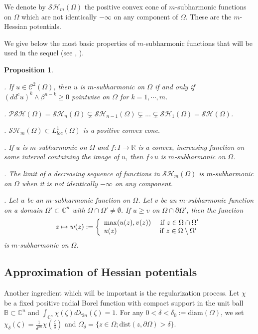 \documentclass[12pt]{amsart}
\newtheorem{proposition}[theorem]{Proposition}
\theoremstyle{definition}
\numberwithin{theorem}{section}
\numberwithin{equation}{section}
\newcommand{\B}{\mathbb{B}}
\newcommand{\C}{\mathbb{C}}
\begin{document}
We denote by $\mathcal{SH}_m (\Omega) $ the positive convex cone of $m$-subharmonic functions on $\Omega$ which are not identically $-\infty$ on any component of $\Omega$.  These are the $m$-Hessian potentials.

We give below the most basic properties of $m$-subharmonic functions that will be used in the sequel (see \cite{Bl05}, \cite{Lu12}).

\begin{proposition}\label{prop:basic}

.  If $u\in \mathcal{C}^2(\Omega)$, then $u$ is  $m$-subharmonic on $\Omega$ if and only if $(dd^c u)^k\wedge \beta^{n-k}\geq0$
pointwise on $\Omega$ for $k=1, \cdots, m$.

 . $\mathcal{PSH}(\Omega)=\mathcal{SH}_n(\Omega)\subsetneq \mathcal{SH}_{n-1}(\Omega)\subsetneq...\subsetneq \mathcal{SH}_1(\Omega)=\mathcal{SH}(\Omega) $.
 
.  $\mathcal{SH}_m(\Omega) \subset L^1_{loc} (\Omega)$ is a positive convex cone. 
  
.  If $u$ is $m$-subharmonic on $\Omega$ and $f: I \rightarrow\mathbb{R}$ is a  convex, increasing function on some interval containing the image of $u$, then $f \circ u$ is $m$-subharmonic on $\Omega$.
  
  
. The limit of a decreasing sequence of  functions in $\mathcal{SH}_m(\Omega)$ is $m$-subharmonic on $\Omega$ when it is not identically $- \infty$ on any component.
 
.  Let $u$ be an $m$-subharmonic function on $\Omega$. Let $v$ be an $m$-subharmonic function on a domain $\Omega'  \subset \C^n$ with $\Omega \cap \Omega' \neq \emptyset$. If $u\geq v$ on $\Omega \cap \partial\Omega'$, then the function
   $$
   z \mapsto w(z):=\left\{\begin{array}{lcl}
\max(u(z),v(z)) &\hbox{ if}\ z \in \Omega \cap \Omega'\\
 u(z)  &\hbox{if}\  z \in\Omega\setminus\Omega'\\
\end{array}\right.
$$
is $m$-subharmonic on $\Omega$.

 \end{proposition}
 
 \subsection{Approximation of Hessian potentials}
 Another ingredient which will be important is the regularization process.  Let $\chi$ be a fixed  positive radial Borel function with compact support in the unit ball $\B \subset \C^n$ and $\int_{\mathbb{C}^n}\chi (\zeta)d\lambda_{2 n}(\zeta)=1$.
   For any $ 0 < \delta < \delta_0 := \mathrm{diam} (\Omega)$, we set 
   $\chi_{\delta}(\zeta)=\frac{1}{\delta^{2n}}\chi (\frac{\zeta}{\delta})$ and $\Omega_{\delta}=\{z \in\Omega;  \mathrm{dist} (z,\partial\Omega)>\delta\}$.
 
\end{document}
